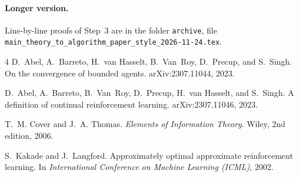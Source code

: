 \documentclass[11pt]{article}
\theoremstyle{definition}
\begin{document}
\paragraph{Longer version.} Line-by-line proofs of Step~3 are in the folder \texttt{archive}, file\\ {\small\texttt{main\_theory\_to\_algorithm\_paper\_style\_2026-11-24.tex}}.

\begin{thebibliography}{4}
D.~Abel, A.~Barreto, H.~van Hasselt, B.~Van~Roy, D.~Precup, and S.~Singh.
\newblock On the convergence of bounded agents.
\newblock arXiv:2307.11044, 2023.

D.~Abel, A.~Barreto, B.~Van~Roy, D.~Precup, H.~van Hasselt, and S.~Singh.
\newblock A definition of continual reinforcement learning.
\newblock arXiv:2307.11046, 2023.

T.~M. Cover and J.~A. Thomas.
\newblock \emph{Elements of Information Theory}.
\newblock Wiley, 2nd edition, 2006.

S.~Kakade and J.~Langford.
\newblock Approximately optimal approximate reinforcement learning.
\newblock In \emph{International Conference on Machine Learning (ICML)}, 2002.
\end{thebibliography}
\end{document}
